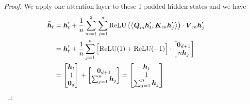 \begin{proof}
We apply one attention layer to these 1-padded hidden states and we have 
\begin{equation}
\begin{aligned}
    \tilde{\boldsymbol{h}}_t  & = \boldsymbol{h}_t' + \frac{1}{n} \sum_{m=1}^2 \sum_{j=1}^n \mathrm{ReLU} \left(\left\langle {\boldsymbol{Q}_m \boldsymbol{h}_t', \boldsymbol{K}_m \boldsymbol{h}_j'} \right\rangle\right) \cdot \boldsymbol{V}_m \boldsymbol{h}_j' \\
    &= \boldsymbol{h}_t' +  \frac{1}{n} \sum_{j=1}^n \Big[\mathrm{ReLU}(1) + \mathrm{ReLU}(-1)\Big] \cdot \begin{bmatrix}
    \boldsymbol{0}_{d+1} \\ n \boldsymbol{h}_j 
\end{bmatrix} \\
    &= \begin{bmatrix}
        \boldsymbol{h}_t \\ 1 \\ \boldsymbol{0}_d
    \end{bmatrix} + 
    \begin{bmatrix}
    \boldsymbol{0}_{d+1} \\  \sum_{j=1}^n \boldsymbol{h}_j 
\end{bmatrix} = \begin{bmatrix}
        \boldsymbol{h}_t \\ 1 \\ \sum_{j=1}^n \boldsymbol{h}_j
    \end{bmatrix}
\end{aligned}
\end{equation}  
\end{proof}


